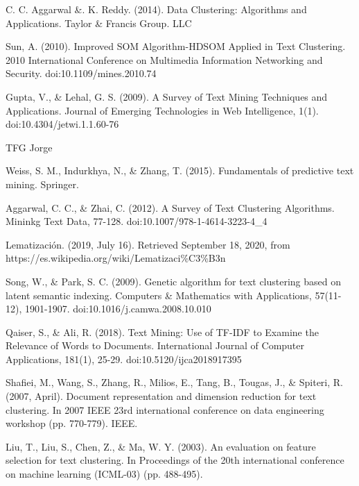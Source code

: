 \documentclass[10pt, a4paper]{article}
\begin{document}
\begin{thebibliography}{X}
 C. C. Aggarwal \&. K. Reddy. (2014). Data Clustering: Algorithms and Applications. Taylor \& Francis Group. LLC

 Sun, A. (2010). Improved SOM Algorithm-HDSOM Applied in Text Clustering. 2010 International Conference on Multimedia Information Networking and Security. doi:10.1109/mines.2010.74

 Gupta, V., \& Lehal, G. S. (2009). A Survey of Text Mining Techniques and Applications. Journal of Emerging Technologies in Web Intelligence, 1(1). doi:10.4304/jetwi.1.1.60-76

 TFG Jorge

 Weiss, S. M., Indurkhya, N., \& Zhang, T. (2015). Fundamentals of predictive text mining. Springer.

 Aggarwal, C. C., \& Zhai, C. (2012). A Survey of Text Clustering Algorithms. Mininkg Text Data, 77-128. doi:10.1007/978-1-4614-3223-4\_4

 Lematización. (2019, July 16). Retrieved September 18, 2020, from https://es.wikipedia.org/wiki/Lematizaci\%C3\%B3n

 Song, W., \& Park, S. C. (2009). Genetic algorithm for text clustering based on latent semantic indexing. Computers \& Mathematics with Applications, 57(11-12), 1901-1907. doi:10.1016/j.camwa.2008.10.010

 Qaiser, S., \& Ali, R. (2018). Text Mining: Use of TF-IDF to Examine the Relevance of Words to Documents. International Journal of Computer Applications, 181(1), 25-29. doi:10.5120/ijca2018917395

 Shafiei, M., Wang, S., Zhang, R., Milios, E., Tang, B., Tougas, J., \& Spiteri, R. (2007, April). Document representation and dimension reduction for text clustering. In 2007 IEEE 23rd international conference on data engineering workshop (pp. 770-779). IEEE.

 Liu, T., Liu, S., Chen, Z., \& Ma, W. Y. (2003). An evaluation on feature selection for text clustering. In Proceedings of the 20th international conference on machine learning (ICML-03) (pp. 488-495).


\end{thebibliography}
\end{document}

